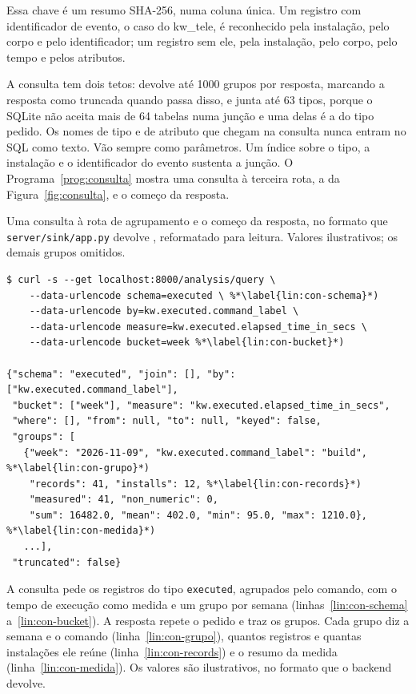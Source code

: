 Essa chave é um resumo SHA-256, numa coluna única. Um registro com identificador de evento, o caso do kw\_tele, é
reconhecido pela instalação, pelo corpo e pelo identificador; um registro sem
ele, pela instalação, pelo corpo, pelo tempo e pelos atributos.

A consulta tem dois tetos: devolve até 1000 grupos por resposta, marcando a
resposta como truncada quando passa disso, e junta até 63 tipos, porque o
SQLite não aceita mais de 64 tabelas numa junção \citep{sqlite_limits} e uma
delas é a do tipo pedido. Os nomes de tipo e de atributo que chegam na
consulta nunca entram no SQL como texto. Vão sempre como parâmetros. Um índice
sobre o tipo, a instalação e o identificador do evento sustenta a junção. O
Programa~\ref{prog:consulta} mostra uma consulta à terceira rota, a da
Figura~\ref{fig:consulta}, e o começo da resposta.

\begin{programruledcaption}{Uma consulta à rota de agrupamento e o começo da resposta, no
    formato que \texttt{server/\allowbreak{}sink/\allowbreak{}app.py} devolve \citep{kwtelemetry_repo}, reformatado para leitura. Valores
    ilustrativos; os demais grupos omitidos.
    \label{prog:consulta}}
\begin{lstlisting}[style=wider]
$ curl -s --get localhost:8000/analysis/query \
    --data-urlencode schema=executed \ %*\label{lin:con-schema}*)
    --data-urlencode by=kw.executed.command_label \
    --data-urlencode measure=kw.executed.elapsed_time_in_secs \
    --data-urlencode bucket=week %*\label{lin:con-bucket}*)

{"schema": "executed", "join": [], "by": ["kw.executed.command_label"],
 "bucket": ["week"], "measure": "kw.executed.elapsed_time_in_secs",
 "where": [], "from": null, "to": null, "keyed": false,
 "groups": [
   {"week": "2026-11-09", "kw.executed.command_label": "build", %*\label{lin:con-grupo}*)
    "records": 41, "installs": 12, %*\label{lin:con-records}*)
    "measured": 41, "non_numeric": 0,
    "sum": 16482.0, "mean": 402.0, "min": 95.0, "max": 1210.0}, %*\label{lin:con-medida}*)
   ...],
 "truncated": false}
\end{lstlisting}
\end{programruledcaption}

A consulta pede os registros do tipo \texttt{executed}, agrupados pelo comando,
com o tempo de execução como medida e um grupo por semana
(linhas~\ref{lin:con-schema} a~\ref{lin:con-bucket}). A resposta repete o
pedido e traz os grupos. Cada grupo diz a semana e o comando
(linha~\ref{lin:con-grupo}), quantos registros e quantas instalações ele
reúne (linha~\ref{lin:con-records}) e o resumo da medida
(linha~\ref{lin:con-medida}). Os valores são ilustrativos, no formato que o
backend devolve.

